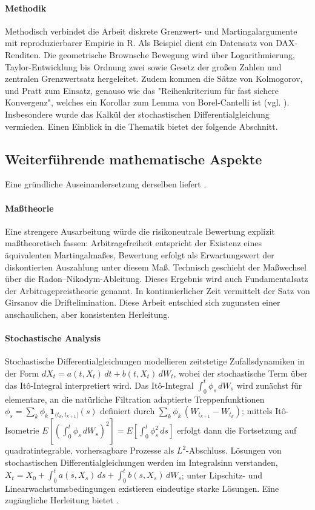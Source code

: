 \paragraph{Methodik}
Methodisch verbindet die Arbeit diskrete Grenzwert- und Martingalargumente mit 
reproduzierbarer Empirie in R. Als Beispiel dient ein Datensatz von DAX-Renditen.
Die geometrische Brownsche Bewegung wird über Logarithmierung, Taylor-Entwicklung bis Ordnung zwei sowie Gesetz der großen Zahlen und 
zentralen Grenzwertsatz hergeleitet. Zudem kommen die Sätze von Kolmogorov, und Pratt zum Einsatz, 
genauso wie das "Reihenkriterium für fast sichere Konvergenz", welches 
ein Korollar zum Lemma von Borel-Cantelli ist (vgl. \cite{henze}). Insbesondere wurde
das Kalkül der stochastischen Differentialgleichung vermieden. Einen Einblick in die Thematik bietet der
folgende Abschnitt.

\subsection{Weiterführende mathematische Aspekte}
Eine gründliche Auseinandersetzung derselben liefert \cite{shreve}.

\paragraph{Maßtheorie}
Eine strengere Ausarbeitung würde die risikoneutrale Bewertung explizit maßtheoretisch fassen: 
Arbitragefreiheit entspricht der Existenz eines äquivalenten Martingalmaßes, Bewertung erfolgt als 
Erwartungswert der diskontierten Auszahlung unter diesem Maß. Technisch geschieht der 
Maßwechsel über die Radon–Nikodym-Ableitung. Dieses Ergebnis wird auch Fundamentalsatz der Arbitragepreistheorie genannt. 
In kontinuierlicher Zeit vermittelt der Satz von Girsanov die Driftelimination. Diese Arbeit entschied sich zugunsten einer anschaulichen, aber 
konsistenten Herleitung.

\paragraph{Stochastische Analysis}
Stochastische Differentialgleichungen modellieren zeitstetige Zufallsdynamiken in der 
Form $dX_t = a(t,X_t)\,dt + b(t,X_t)\,dW_t$, wobei der stochastische Term über das It\^o-Integral interpretiert wird.
Das It\^o-Integral $\int_0^t \phi_s\,dW_s$ wird zunächst für elementare, an die natürliche Filtration adaptierte 
Treppenfunktionen $\phi_s = \sum_k \phi_k\,\mathbf{1}_{(t_k,t_{k+1}]}(s)$ definiert durch $\sum_k \phi_k\,(W_{t_{k+1}}-W_{t_k})$; 
mittels It\^o-Isometrie $E\!\left[\left(\int_0^t \phi_s\,dW_s\right)^2\right] = E\!\left[\int_0^t \phi_s^2\,ds\right]$ erfolgt dann die 
Fortsetzung auf quadratintegrable, vorhersagbare Prozesse als $L^2$-Abschluss. Lösungen von stochastischen Differentialgleichungen werden im Integralsinn 
verstanden, $X_t = X_0 + \int_0^t a(s,X_s)\,ds + \int_0^t b(s,X_s)\,dW_s$; 
unter Lipschitz- und Linearwachstumsbedingungen existieren eindeutige starke Lösungen. Eine zugängliche
Herleitung bietet \cite{behrends}.

